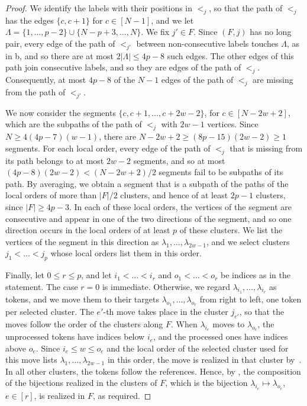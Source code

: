 \documentclass[fontsize=12pt,leading=14pt]{fullpaper}
\begin{document}
\begin{proof}
  We identify the labels with their positions in $<_j$, so that the path of $<_j$ has the edges $\{c,c+1\}$ for $c\in[N-1]$, and we let $\Lambda=\{1,\dots,p-2\}\cup\{N-p+3,\dots,N\}$.
  We fix $j'\in F$.
  Since $(F,j)$ has no long pair, every edge of the path of $<_{j'}$ between non-consecutive labels touches $\Lambda$, as in b, and so there are at most $2|\Lambda|\le4p-8$ such edges.
  The other edges of this path join consecutive labels, and so they are edges of the path of $<_j$.
  Consequently, at most $4p-8$ of the $N-1$ edges of the path of $<_j$ are missing from the path of $<_{j'}$.

  We now consider the segments $\{c,c+1,\dots,c+2w-2\}$, for $c\in[N-2w+2]$, which are the subpaths of the path of $<_j$ with $2w-1$ vertices.
  Since $N\ge4(4p-7)(w-1)$, there are $N-2w+2\ge(8p-15)(2w-2)\ge1$ segments.
  For each local order, every edge of the path of $<_j$ that is missing from its path belongs to at most $2w-2$ segments, and so at most $(4p-8)(2w-2)<(N-2w+2)/2$ segments fail to be subpaths of its path.
  By averaging, we obtain a segment that is a subpath of the paths of the local orders of more than $|F|/2$ clusters, and hence of at least $2p-1$ clusters, since $|F|\ge4p-3$.
  In each of these local orders, the vertices of the segment are consecutive and appear in one of the two directions of the segment, and so one direction occurs in the local orders of at least $p$ of these clusters.
  We list the vertices of the segment in this direction as $\lambda_1,\dots,\lambda_{2w-1}$, and we select clusters $j_1<\dots<j_p$ whose local orders list them in this order.

  Finally, let $0\le r\le p$, and let $i_1<\dots<i_r$ and $o_1<\dots<o_r$ be indices as in the statement.
  The case $r=0$ is immediate.
  Otherwise, we regard $\lambda_{i_1},\dots,\lambda_{i_r}$ as tokens, and we move them to their targets $\lambda_{o_1},\dots,\lambda_{o_r}$ from right to left, one token per selected cluster.
  The $e'$-th move takes place in the cluster $j_{e'}$, so that the moves follow the order of the clusters along $F$.
  When $\lambda_{i_e}$ moves to $\lambda_{o_e}$, the unprocessed tokens have indices below $i_e$, and the processed ones have indices above $o_e$.
  Since $i_e\le w\le o_e$ and the local order of the selected cluster used for this move lists $\lambda_1,\dots,\lambda_{2w-1}$ in this order, the move is realized in that cluster by~.
  In all other clusters, the tokens follow the references.
  Hence, by , the composition of the bijections realized in the clusters of $F$, which is the bijection $\lambda_{i_e}\mapsto\lambda_{o_e}$, $e\in[r]$, is realized in $F$, as required.
\end{proof}
\end{document}
